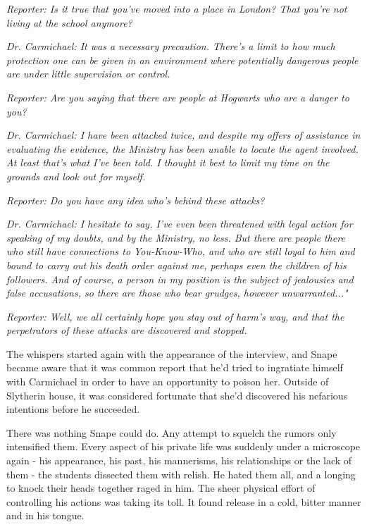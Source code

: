 \emph{Reporter: Is it true that you've moved into a place in London? That you're not living at the school anymore?}

\emph{Dr. Carmichael: It was a necessary precaution. There's a limit to how much protection one can be given in an environment where potentially dangerous people are under little supervision or control.}

\emph{Reporter: Are you saying that there are people at Hogwarts who are a danger to you?}

\emph{Dr. Carmichael: I have been attacked twice, and despite my offers of assistance in evaluating the evidence, the Ministry has been unable to locate the agent involved. At least that's what I've been told. I thought it best to limit my time on the grounds and look out for myself.}

\emph{Reporter: Do you have any idea who's behind these attacks?}

\emph{Dr. Carmichael: I hesitate to say. I've even been threatened with legal action for speaking of my doubts, and by the Ministry, no less. But there are people there who still have connections to You-Know-Who, and who are still loyal to him and bound to carry out his death order against me, perhaps even the children of his followers. And of course, a person in my position is the subject of jealousies and false accusations, so there are those who bear grudges, however unwarranted..."}

\emph{Reporter: Well, we all certainly hope you stay out of harm's way, and that the perpetrators of these attacks are discovered and stopped.}

The whispers started again with the appearance of the interview, and Snape became aware that it was common report that he'd tried to ingratiate himself with Carmichael in order to have an opportunity to poison her. Outside of Slytherin house, it was considered fortunate that she'd discovered his nefarious intentions before he succeeded.

There was nothing Snape could do. Any attempt to squelch the rumors only intensified them. Every aspect of his private life was suddenly under a microscope again - his appearance, his past, his mannerisms, his relationships or the lack of them - the students dissected them with relish. He hated them all, and a longing to knock their heads together raged in him. The sheer physical effort of controlling his actions was taking its toll. It found release in a cold, bitter manner and in his tongue.

